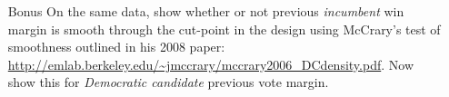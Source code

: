 \documentclass{article}
\begin{document}
\begin{enumerate}


\item[Bonus] On the same data, show whether or not previous {\em incumbent} win margin is
 smooth through the cut-point in the design using McCrary's test of
 smoothness outlined in his 2008 paper:
 \url{http://emlab.berkeley.edu/~jmccrary/mccrary2006_DCdensity.pdf}.
 Now show this for {\em Democratic candidate} previous vote margin.
\end{enumerate}
\end{document}

